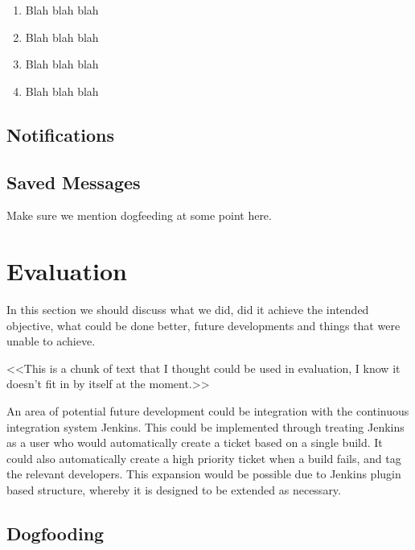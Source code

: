 \documentclass[a4paper]{l3proj}
\begin{document}
\begin{enumerate}
\item Blah blah blah
\item Blah blah blah
\item Blah blah blah
\item Blah blah blah
\end{enumerate}

\section{Notifications}


\section{Saved Messages}

Make sure we mention dogfeeding at some point here.

\chapter{Evaluation}

In this section we should discuss what we did, did it achieve the intended objective, what could be done better, 
future developments and things that were unable to achieve.

<<This is a chunk of text that I thought could be used in evaluation, I know it doesn't fit in by itself at the moment.>>

An area of potential future development could be integration with the continuous integration system Jenkins.  This 
could be implemented through treating Jenkins as a user who would automatically create a ticket based on a single build.  
It could also automatically create a high priority ticket when a build fails, and tag the relevant developers.  This 
expansion would be possible due to Jenkins plugin based structure, whereby it is designed to be extended as necessary.

\section{Dogfooding}
\end{document}

